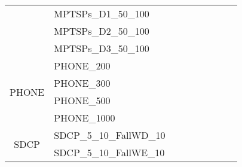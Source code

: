 \begin{table}[]
{\begin{tabular}{|c|l|ll|ll|l|l|l|}
			& MPTSPs\_D1\_50\_100           &                                 &                                &                                  &                                 &                                    &                            &                            \\
			& MPTSPs\_D2\_50\_100           &                                 &                                &                                  &                                 &                                    &                            &                            \\
			& MPTSPs\_D3\_50\_100           &                                 &                                &                                  &                                 &                                    &                            &                            \\ \hline
			\multirow{4}{*}{PHONE}   & PHONE\_200                    &                                 &                                &                                  &                                 &                                    &                            &                            \\
			& PHONE\_300                    &                                 &                                &                                  &                                 &                                    &                            &                            \\
			& PHONE\_500                    &                                 &                                &                                  &                                 &                                    &                            &                            \\
			& PHONE\_1000                   &                                 &                                &                                  &                                 &                                    &                            &                            \\ \hline
			\multirow{8}{*}{SDCP}    & SDCP\_5\_10\_FallWD\_10       &                                 &                                &                                  &                                 &                                    &                            &                            \\
			& SDCP\_5\_10\_FallWE\_10       &                                 &                                &                                  &                                 &                                    &                            &                            \\

\end{tabular}}
\end{table}

